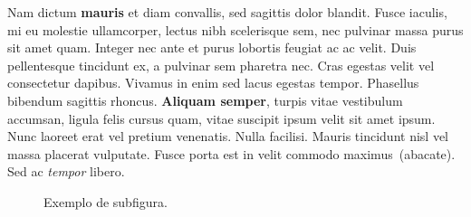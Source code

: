 \documentclass[12pt]{article}
\begin{document}
Nam dictum \textbf{mauris} et diam convallis, sed sagittis dolor blandit. Fusce iaculis, mi eu molestie ullamcorper, lectus nibh scelerisque sem, nec pulvinar massa purus sit amet quam. Integer nec ante et purus lobortis feugiat ac ac velit. Duis pellentesque tincidunt ex, a pulvinar sem pharetra nec. Cras egestas velit vel consectetur dapibus. Vivamus in enim sed lacus egestas tempor. Phasellus bibendum sagittis rhoncus. \textbf{Aliquam semper}, turpis vitae vestibulum accumsan, ligula felis cursus quam, vitae suscipit ipsum velit sit amet ipsum. Nunc laoreet erat vel pretium venenatis. Nulla facilisi. Mauris tincidunt nisl vel massa placerat vulputate. Fusce porta est in velit commodo maximus~(abacate). Sed ac \textit{tempor} libero.


\begin{figure}[h]
  \centering
  
  
  
  \caption{Exemplo de subfigura.}
  \label{fig_exemplo2}
\end{figure}
\end{document}
